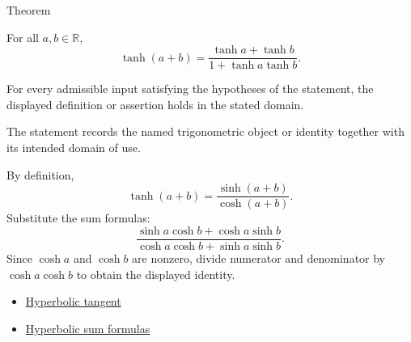 \begin{theorembox}{Theorem}
\begin{theorem}
\label{thm:hyperbolic-tangent-sum-formula}
For all $a,b\in\mathbb{R}$,
\[
  \tanh(a+b)=
  \frac{\tanh a+\tanh b}{1+\tanh a\tanh b}.
\]
\end{theorem}
\end{theorembox}
\begin{remark*}
For every admissible input satisfying the hypotheses of the statement, the
displayed definition or assertion holds in the stated domain.
\end{remark*}

\begin{remark*}[Interpretation]
The statement records the named trigonometric object or identity together with
its intended domain of use.
\end{remark*}

\begin{remark*}[Proof]
By definition,
\[
  \tanh(a+b)=\frac{\sinh(a+b)}{\cosh(a+b)}.
\]
Substitute the sum formulas:
\[
  \frac{\sinh a\cosh b+\cosh a\sinh b}
       {\cosh a\cosh b+\sinh a\sinh b}.
\]
Since $\cosh a$ and $\cosh b$ are nonzero, divide numerator and denominator by
$\cosh a\cosh b$ to obtain the displayed identity.
\end{remark*}
\begin{dependencies}
\begin{itemize}
  \item \hyperref[def:hyperbolic-tangent]{Hyperbolic tangent}
  \item \hyperref[thm:hyperbolic-sum-formulas]{Hyperbolic sum formulas}
\end{itemize}
\end{dependencies}
